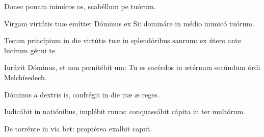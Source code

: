 \item {}

\item Donec ponam inimícos os,\psstar{} scabéllum pe tuórum.

\item Virgam virtútis tuæ emíttet Dóminus ex Si:\psstar{} domináre in médio inimicó tuórum.

\item Tecum princípium in die virtútis tuæ in splendóribus sanrum:\psstar{} ex útero ante lucírum génui te.

\item Iurávit Dóminus, et non pœnitébit um:\psstar{} Tu es sacérdos in ætérnum secúndum órdi Melchísedech.

\item Dóminus a dextris is,\psstar{} confrégit in die iræ æ reges.

\item Iudicábit in natiónibus, implébit runas:\psstar{} conquassábit cápita in ter multórum.

\item De torrénte in via bet:\psstar{} proptérea exalbit caput.
